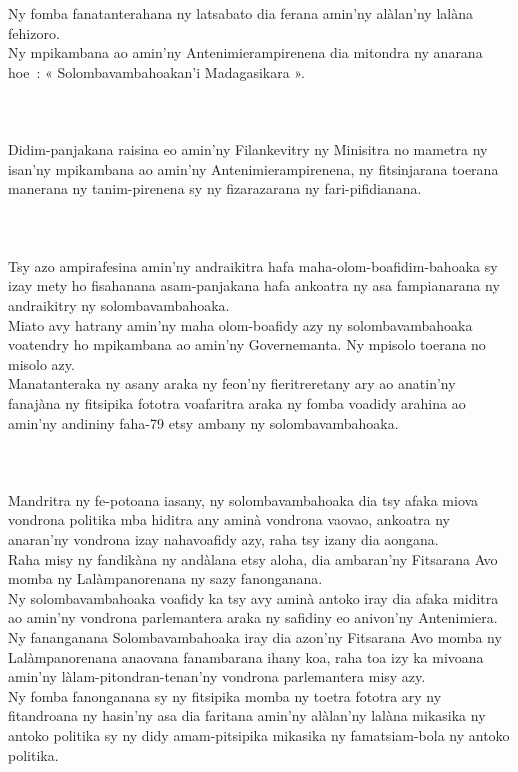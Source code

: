 \documentclass[12pt]{article}
\newcounter{laharana}
\newcommand{\andininy}[0]{
  \paragraph{%
    \NoCaseChange{%
      Andininy~\addtocounter{laharana}{1}\thelaharana.}\label{and:\thelaharana}~%
  }%
}
\begin{document}
\noindent
Ny fomba fanatanterahana ny latsabato dia ferana amin'ny alàlan'ny lalàna
fehizoro.\\

\noindent
Ny mpikambana ao amin'ny Antenimierampirenena dia mitondra ny anarana hoe~: «
Solombavambahoakan'i Madagasikara ».

\andininy{}Didim-panjakana raisina eo amin'ny Filankevitry ny Minisitra no
mametra ny isan'ny mpikambana ao amin'ny Antenimierampirenena, ny fitsinjarana
toerana manerana ny tanim-pirenena sy ny fizarazarana ny fari-pifidianana.

\andininy{}Tsy azo ampirafesina amin'ny andraikitra hafa
maha-olom-boafidim-bahoaka sy izay mety ho fisahanana asam-panjakana hafa
ankoatra ny asa fampianarana ny andraikitry ny solombavambahoaka.\\

\noindent
Miato avy hatrany amin'ny maha olom-boafidy azy ny solombavambahoaka voatendry
ho mpikambana ao amin'ny Governemanta. Ny mpisolo toerana no misolo azy.\\

\noindent
Manatanteraka ny asany araka ny feon'ny fieritreretany ary ao anatin'ny fanajàna
ny fitsipika fototra voafaritra araka ny fomba voadidy arahina ao amin'ny
andininy faha-79 etsy ambany ny solombavambahoaka.

\andininy{}Mandritra ny fe-potoana iasany, ny solombavambahoaka dia tsy afaka
miova vondrona politika mba hiditra any aminà vondrona vaovao, ankoatra ny
anaran'ny vondrona izay nahavoafidy azy, raha tsy izany dia aongana.\\

\noindent
Raha misy ny fandikàna ny andàlana etsy aloha, dia ambaran'ny Fitsarana Avo
momba ny Lalàmpanorenana ny sazy fanonganana.\\

\noindent
Ny solombavambahoaka voafidy ka tsy avy aminà antoko iray dia afaka miditra ao
amin'ny vondrona parlemantera araka ny safidiny eo anivon'ny Antenimiera.\\

\noindent
Ny fananganana Solombavambahoaka iray dia azon'ny Fitsarana Avo momba ny
Lalàmpanorenana anaovana fanambarana ihany koa, raha toa izy ka mivoana amin'ny
làlam-pitondran-tenan'ny vondrona parlemantera misy azy.\\

\noindent
Ny fomba fanonganana sy ny fitsipika momba ny toetra fototra ary ny fitandroana
ny hasin'ny asa dia faritana amin'ny alàlan'ny lalàna mikasika ny antoko
politika sy ny didy amam-pitsipika mikasika ny famatsiam-bola ny antoko
politika.
\end{document}

